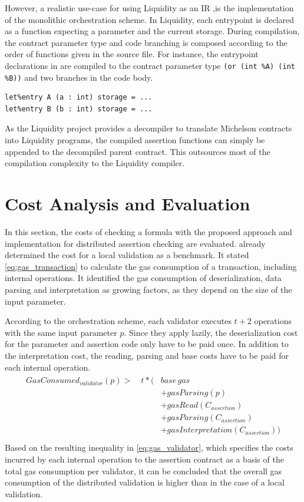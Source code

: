 However, a realistic use-case for using Liquidity as an IR ,is the implementation of the monolithic orchestration scheme. In Liquidity, each entrypoint is declared as a function expecting a parameter and the current storage. During compilation, the contract parameter type and code branching is composed according to the order of functions given in the source file. For instance, the entrypoint declarations in  are compiled to the contract parameter type \texttt{(or (int \%A) (int \%B))} and two branches in the code body.  
\begin{lstlisting}[numbers=none, label=lst:liq_eps, caption=Entrypoint declarations in Liquidity]
let%entry A (a : int) storage = ...
let%entry B (b : int) storage = ...
\end{lstlisting}
As the Liquidity project provides a decompiler to translate Michelson contracts into Liquidity programs, the compiled assertion functions can simply be appended to the decompiled parent contract. This outsources most of the compilation complexity to the Liquidity compiler.

\section{Cost Analysis and Evaluation}\label{sec:cost_analysis_distributed}
In this section, the costs of checking a formula with the proposed approach and implementation for distributed assertion checking are evaluated.  already determined the cost for a local validation as a benchmark. It stated \eqref{eq:gas_transaction} to calculate the gas consumption of a transaction, including internal operations. It identified the gas consumption of deserialization, data parsing and interpretation as growing factors, as they depend on the size of the input parameter.

According to the orchestration scheme, each validator executes $t+2$ operations with the same input parameter $p$. Since they apply lazily, the deserialization cost for the parameter and assertion code only have to be paid once. In addition to the interpretation cost, the reading, parsing and base costs have to be paid for each internal operation. 
\begin{align}\label{eq:gas_validator}
\begin{split}
GasConsumed_{validator}(p) > \quad t * (&base\, gas \\
&+ gasParsing(p) \\
&+ gasRead(C_{assertion}) \\
&+ gasParsing(C_{assertion}) \\
&+ gasInterpretation(C_{assertion})) \\
\end{split}
\end{align}
Based on the resulting inequality in \eqref{eq:gas_validator}, which specifies the costs incurred by each internal operation to the assertion contract as a basis of the total gas consumption per validator, it can be concluded that the overall gas consumption of the distributed validation is higher than in the case of a local validation.

